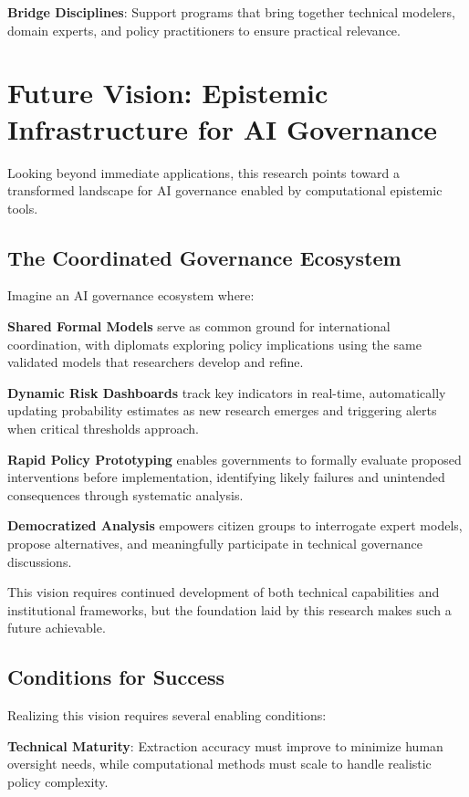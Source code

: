 \documentclass[
  11pt,
  letterpaper,
]{book}
\begin{document}
\textbf{Bridge Disciplines}: Support programs that bring together
technical modelers, domain experts, and policy practitioners to ensure
practical relevance.

\section{Future Vision: Epistemic Infrastructure for AI
Governance}\label{sec-future-vision}

Looking beyond immediate applications, this research points toward a
transformed landscape for AI governance enabled by computational
epistemic tools.

\subsection{The Coordinated Governance
Ecosystem}\label{sec-governance-ecosystem}

Imagine an AI governance ecosystem where:

\textbf{Shared Formal Models} serve as common ground for international
coordination, with diplomats exploring policy implications using the
same validated models that researchers develop and refine.

\textbf{Dynamic Risk Dashboards} track key indicators in real-time,
automatically updating probability estimates as new research emerges and
triggering alerts when critical thresholds approach.

\textbf{Rapid Policy Prototyping} enables governments to formally
evaluate proposed interventions before implementation, identifying
likely failures and unintended consequences through systematic analysis.

\textbf{Democratized Analysis} empowers citizen groups to interrogate
expert models, propose alternatives, and meaningfully participate in
technical governance discussions.

This vision requires continued development of both technical
capabilities and institutional frameworks, but the foundation laid by
this research makes such a future achievable.

\subsection{Conditions for Success}\label{sec-success-conditions}

Realizing this vision requires several enabling conditions:

\textbf{Technical Maturity}: Extraction accuracy must improve to
minimize human oversight needs, while computational methods must scale
to handle realistic policy complexity.
\end{document}
